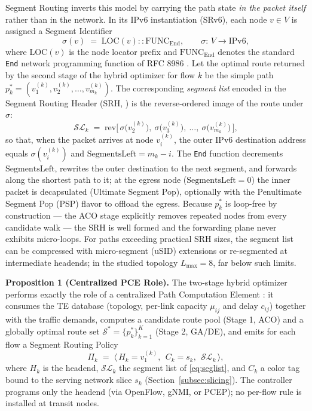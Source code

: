 Segment Routing \cite{rfc8402,filsfils2015sr} inverts this model by carrying
the path state \emph{in the packet itself} rather than in the network. In its
IPv6 instantiation (SRv6), each node $v \in V$ is assigned a Segment
Identifier
\begin{equation}
\sigma(v) \;=\; \mathrm{LOC}(v){:}{:}\mathrm{FUNC}_{\mathrm{End}},
\qquad \sigma:\, V \rightarrow \mathrm{IPv6},
\label{eq:sid}
\end{equation}
where $\mathrm{LOC}(v)$ is the node locator prefix and
$\mathrm{FUNC}_{\mathrm{End}}$ denotes the standard \texttt{End} network
programming function of RFC 8986 \cite{rfc8986}. Let the optimal route
returned by the second stage of the hybrid optimizer for flow $k$ be the
simple path $p^{*}_k = (v^{(k)}_1, v^{(k)}_2, \ldots, v^{(k)}_{m_k})$. The
corresponding \emph{segment list} encoded in the Segment Routing Header (SRH,
\cite{rfc8754}) is the reverse-ordered image of the route under $\sigma$:
\begin{equation}
\mathcal{SL}_k \;=\; \mathrm{rev}\bigl[\,
\sigma\bigl(v^{(k)}_2\bigr),\ \sigma\bigl(v^{(k)}_3\bigr),\ \ldots,\
\sigma\bigl(v^{(k)}_{m_k}\bigr)\,\bigr],
\label{eq:seglist}
\end{equation}
so that, when the packet arrives at node $v^{(k)}_i$, the outer IPv6
destination address equals $\sigma(v^{(k)}_i)$ and
$\mathrm{SegmentsLeft} = m_k - i$. The \texttt{End} function decrements
$\mathrm{SegmentsLeft}$, rewrites the outer destination to the next segment,
and forwards along the shortest path to it; at the egress node
($\mathrm{SegmentsLeft} = 0$) the inner packet is decapsulated (Ultimate
Segment Pop), optionally with the Penultimate Segment Pop (PSP) flavor to
offload the egress. Because $p^{*}_k$ is loop-free by construction --- the
ACO stage explicitly removes repeated nodes from every candidate walk --- the
SRH is well formed and the forwarding plane never exhibits micro-loops. For
paths exceeding practical SRH sizes, the segment list can be compressed with
micro-segment (uSID) extensions or re-segmented at intermediate headends; in
the studied topology $L_{\max} = 8$, far below such limits.

\noindent\textbf{Proposition 1 (Centralized PCE Role).} The two-stage hybrid
optimizer performs exactly the role of a centralized Path Computation Element
\cite{rfc4655}: it consumes the TE database (topology, per-link capacity
$\mu_{ij}$ and delay $c_{ij}$) together with the traffic demands, computes a
candidate route pool (Stage 1, ACO) and a globally optimal route set
$\mathcal{S}^{*} = \{p^{*}_k\}_{k=1}^{K}$ (Stage 2, GA/DE), and emits for each
flow a Segment Routing Policy \cite{rfc9256}
\begin{equation}
\Pi_k \;=\; \bigl\langle\, H_k = v^{(k)}_1,\ \ C_k = s_k,\ \
\mathcal{SL}_k \,\bigr\rangle,
\label{eq:srpolicy}
\end{equation}
where $H_k$ is the headend, $\mathcal{SL}_k$ the segment list of
\eqref{eq:seglist}, and $C_k$ a color tag bound to the serving network slice
$s_k$ (Section~\ref{subsec:slicing}). The controller programs only the
headend (via OpenFlow, gNMI, or PCEP); no per-flow rule is installed at
transit nodes.

